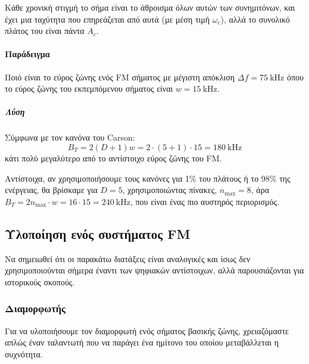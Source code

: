 \documentclass[11pt,a4paper,notitlepage,fleqn]{article}
\begin{document}

Κάθε χρονική στιγμή το σήμα είναι το άθροισμα όλων αυτών των συνημιτόνων, και έχει μια
ταχύτητα που επηρεάζεται από αυτά (με μέση τιμή \( \omega_c \)), αλλά το συνολικό πλάτος του
είναι πάντα \( A_c \).

\paragraph{Παράδειγμα}
Ποιό είναι το εύρος ζώνης ενός FM σήματος με μέγιστη απόκλιση \( Δf = \SI{75}{\kilo\hertz} \)
όπου το εύρος ζώνης του εκπεμπόμενου σήματος είναι \( w=\SI{15}{\kilo\hertz} \).

\subparagraph{Λύση}
Σύμφωνα με τον κανόνα του Carson:
\[
B_T = 2(D+1)w = 2\cdot(5+1)\cdot 15 = \SI{180}{\kilo\hertz}
\]
κάτι πολύ μεγαλύτερο από το αντίστοιχο εύρος ζώνης του FM.

Αντίστοιχα, αν χρησιμοποιήσουμε τους κανόνες για 1\% του πλάτους ή το 98\% της ενέργειας,
θα βρίσκαμε για \( D=5 \), χρησιμοποιώντας πίνακες, \( n_{\max} = 8 \), άρα
\( B_T = 2n_{\max} \cdot w = 16\cdot 15 = \SI{240}{\kilo\hertz} \), που είναι ένας πιο
αυστηρός περιορισμός.

\subsection{Υλοποίηση ενός συστήματος FM}
Να σημειωθεί ότι οι παρακάτω διατάξεις είναι αναλογικές και ίσως δεν χρησιμοποιούνται
σήμερα έναντι των ψηφιακών αντίστοιχων, αλλά παρουσιάζονται για ιστορικούς σκοπούς.

\subsubsection{Διαμορφωτής}
Για να υλοποιήσουμε τον διαμορφωτή ενός σήματος βασικής ζώνης,
χρειαζόμαστε απλώς έναν ταλαντωτή που να παράγει ένα ημίτονο του
οποίου μεταβάλλεται η συχνότητα.
\end{document}
